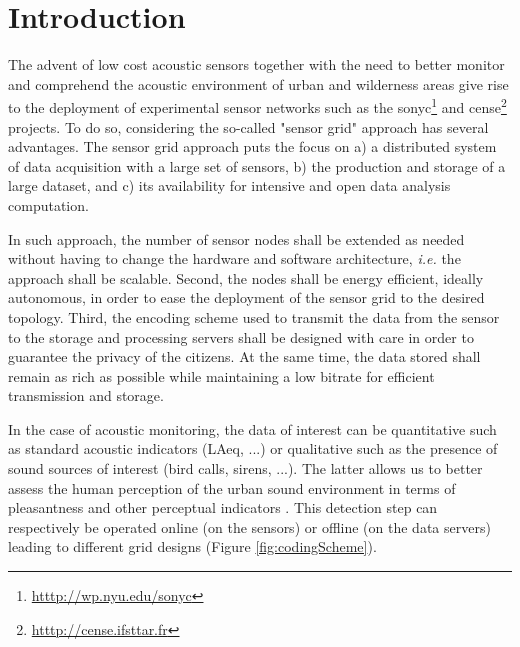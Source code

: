 \documentclass[sensors,article,submit,moreauthors,pdftex,10pt,a4paper]{mdpi}
\begin{document}


\section{Introduction}

The advent of low cost acoustic sensors together with the need to better monitor and comprehend the acoustic environment of urban and wilderness areas give rise to the deployment of experimental sensor networks such as the sonyc\footnote{\url{htttp://wp.nyu.edu/sonyc}} \cite{mydlarz2017implementation} and cense\footnote{\url{htttp://cense.ifsttar.fr}} \cite{picault2017} projects. To do so, considering the so-called "sensor grid" approach  \cite{lim2005sensor,tham2005sensorgrid} has several advantages. The sensor grid approach puts the focus on a) a distributed system of data acquisition with a large set of sensors, b) the production and storage of a large dataset, and c) its availability for intensive and open data analysis computation.

In such approach,  the number of sensor nodes shall be extended as needed without having to change the hardware and software architecture, \textit{i.e.} the approach shall be scalable. Second, the nodes shall be energy efficient, ideally autonomous, in order to ease the deployment of the sensor grid to the desired topology. Third, the encoding scheme used to transmit the data from the sensor to the storage and processing servers shall be designed with care in order to guarantee the privacy of the citizens. At the same time, the data stored shall remain as rich as possible while maintaining a low bitrate for efficient transmission and storage.

In the case of acoustic monitoring, the data of interest can be quantitative such as standard acoustic indicators (LAeq, ...) or qualitative such as the presence of sound sources of interest (bird calls, sirens, ...). The latter allows us to better assess the human perception of the urban sound environment in terms of pleasantness and other perceptual indicators \cite{lavandier2006contribution, aumond2017modeling}. This detection step can respectively be operated online (on the sensors) or offline (on the data servers) leading to different grid designs (Figure \ref{fig:codingScheme}).
\end{document}
